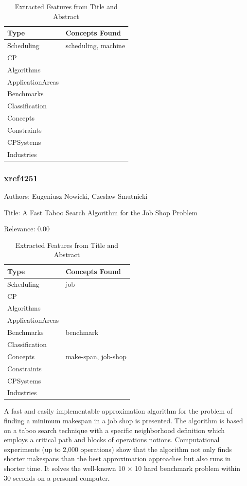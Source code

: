 {\scriptsize
\begin{longtable}{p{2cm}p{20cm}}
\caption{Extracted Features from Title and Abstract}\\ \toprule
Type & Concepts Found\\ \midrule
\endhead
\bottomrule
\endfoot
Scheduling & scheduling, machine\\ 
CP & \\ 
Algorithms & \\ 
ApplicationAreas & \\ 
Benchmarks & \\ 
Classification & \\ 
Concepts & \\ 
Constraints & \\ 
CPSystems & \\ 
Industries & \\ 
\end{longtable}
}



\subsubsection{xref4251}
\label{mw:xref4251}

Authors: Eugeniusz Nowicki, Czeslaw Smutnicki

Title: A Fast Taboo Search Algorithm for the Job Shop Problem

Relevance:  0.00

{\scriptsize
\begin{longtable}{p{2cm}p{20cm}}
\caption{Extracted Features from Title and Abstract}\\ \toprule
Type & Concepts Found\\ \midrule
\endhead
\bottomrule
\endfoot
Scheduling & job\\ 
CP & \\ 
Algorithms & \\ 
ApplicationAreas & \\ 
Benchmarks & benchmark\\ 
Classification & \\ 
Concepts & make-span, job-shop\\ 
Constraints & \\ 
CPSystems & \\ 
Industries & \\ 
\end{longtable}
}

  A fast and easily implementable approximation algorithm for the problem of finding a minimum makespan in a job shop is presented. The algorithm is based on a taboo search technique with a specific neighborhood definition which employs a critical path and blocks of operations notions. Computational experiments (up to 2,000 operations) show that the algorithm not only finds shorter makespans than the best approximation approaches but also runs in shorter time. It solves the well-known 10 × 10 hard benchmark problem within 30 seconds on a personal computer.  


